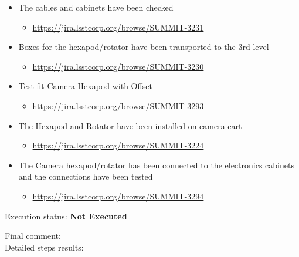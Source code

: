 \documentclass[SE,lsstdraft,STR,toc]{lsstdoc}
\providecommand{\tightlist}{
  \setlength{\itemsep}{0pt}\setlength{\parskip}{0pt}}
\begin{document}
\begin{itemize}
\tightlist
\item
  The cables and cabinets have been checked~

  \begin{itemize}
  \tightlist
  \item
    \url{https://jira.lsstcorp.org/browse/SUMMIT-3231}
  \end{itemize}
\item
  Boxes for the hexapod/rotator have been transported to the 3rd level

  \begin{itemize}
  \tightlist
  \item
    \url{https://jira.lsstcorp.org/browse/SUMMIT-3230}
  \end{itemize}
\item
  Test fit Camera Hexapod with Offset

  \begin{itemize}
  \tightlist
  \item
    \url{https://jira.lsstcorp.org/browse/SUMMIT-3293}
  \end{itemize}
\item
  The Hexapod and Rotator have been installed on camera cart

  \begin{itemize}
  \tightlist
  \item
    \url{https://jira.lsstcorp.org/browse/SUMMIT-3224}
  \end{itemize}
\item
  The Camera hexapod/rotator has been connected to the electronics
  cabinets and the connections have been tested

  \begin{itemize}
  \tightlist
  \item
    \url{https://jira.lsstcorp.org/browse/SUMMIT-3294}
  \end{itemize}
\end{itemize}


Execution status: {\bf Not Executed }

Final comment:\\


Detailed steps results:
\end{document}
